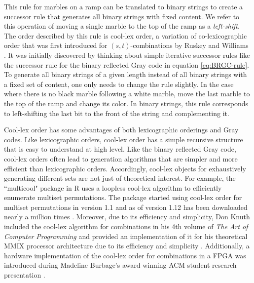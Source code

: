 This rule for marbles on a ramp can be translated to binary strings to create a successor rule that generates all binary strings with fixed content.  We refer to this operation of moving a single marble to the top of the ramp as a \emph{left-shift}.
The order described by this rule is 
cool-lex order, a variation of co-lexicographic order that was first introduced for $(s,t)$-combinations by Ruskey and Williams \cite{ruskey2005generating,ruskey2009generating}.  It was initially discovered by thinking about simple iterative successor rules like the successor rule for the binary reflected Gray code in equation \eqref{eq:BRGC-rule}. To generate all binary strings of a given length instead of all binary strings with a fixed set of content, one only needs to change the rule slightly.  In the case where there is no black marble following a white marble, move the last marble to the top of the ramp and change its color.  In binary strings, this rule corresponds to left-shifting the last bit to the front of the string and complementing it.

Cool-lex order has some advantages of both lexicographic orderings and Gray codes.  Like lexicographic orders, cool-lex order has a simple recursive structure that is easy to understand at  high level.  
Like the binary reflected Gray code, cool-lex orders often lead to generation algorithms that are simpler and more efficient than lexicographic orders.  Accordingly, cool-lex objects for exhaustively generating different sets are not just of theoretical interest.
For example, the ``multicool" package in R uses a loopless cool-lex algorithm to efficiently enumerate multiset permutations.   The package started using cool-lex order for multiset permutations in version 1.1 and as of version 1.12 has been downloaded nearly a million times \cite{multicool_2021}.  Moreover, due to its efficiency and simplicity, Don Knuth included the cool-lex algorithm for combinations in his 4th volume of \emph{The Art of Computer Programming} and provided an implementation of it for his theoretical MMIX processor architecture due to its efficiency and simplicity \cite{knuth2015art}.  Additionally, a hardware implementation of the cool-lex order for combinations in a FPGA was introduced during Madeline Burbage's award winning ACM student research presentation \cite{burbage2020cool}.






